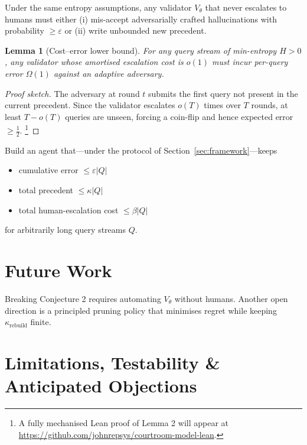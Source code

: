 \documentclass[11pt]{article}
\newtheorem{lemma}{Lemma}
\begin{document}
\begin{conjecture} \label{conjecture2} Under the same entropy
assumptions, any validator \(V_\theta\) that never escalates to humans must either
(i) mis-accept adversarially crafted hallucinations with probability \(\geq \varepsilon\)
or (ii) write unbounded new precedent.
\end{conjecture}

\begin{lemma}[Cost–error lower bound]\label{lem:cost-error}
  For any query stream of min-entropy $H>0$, any validator whose
  \emph{amortised escalation cost} is $o(1)$ must incur
  \emph{per-query error} $\Omega(1)$ against an adaptive adversary.
\end{lemma}

\begin{proof}[Proof sketch]
  The adversary at round $t$ submits the first query not present in
  the current precedent.  Since the validator escalates $o(T)$ times
  over $T$ rounds, at least $T - o(T)$ queries are unseen, forcing a
  coin-flip and hence expected error $\ge \tfrac12$. \footnote{A fully mechanised Lean proof of Lemma 2 will appear at \url{https://github.com/johnrepsys/courtroom-model-lean}.}
\end{proof}

\begin{tcolorbox}[title=Falsify-Us]
  Build an agent that—under the protocol of Section~\ref{sec:framework}—keeps
  \begin{itemize}
    \item cumulative error $\leq \varepsilon|Q|$
    \item total precedent $\leq \kappa|Q|$
    \item total human-escalation cost $\leq \beta|Q|$
  \end{itemize}
  for arbitrarily long query streams $Q$.
\end{tcolorbox}

\section{Future Work}
\label{sec:conclusion}
Breaking Conjecture 2 requires automating $V_\theta$ without humans. Another open direction is a principled pruning policy that minimises regret while keeping \(\kappa_{\text{rebuild}}\) finite.

\appendix
\section{Limitations, Testability \& Anticipated Objections}
\label{app:limits}
\end{document}

